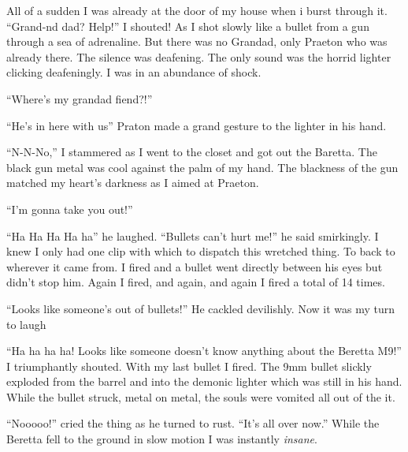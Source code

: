 All of a sudden I was already at the door of my house when i burst
through it. ``Grand-nd dad? Help!'' I shouted! As I shot slowly like
a bullet from a gun through a sea of adrenaline. But there was no
Grandad, only Praeton who was already there. The silence was
deafening. The only sound was the horrid lighter clicking
deafeningly. I was in an abundance of shock.



``Where's my grandad fiend?!''



``He's in here with us'' Praton made a grand gesture to the lighter
in his hand.



``N-N-No,'' I stammered as I went to the closet and got out the
Baretta. The black gun metal was cool against the palm of my hand.
The blackness of the gun matched my heart's darkness as I aimed at
Praeton.

``I'm gonna take you out!''

``Ha Ha Ha Ha ha'' he laughed. ``Bullets can't hurt me!'' he said
smirkingly. I knew I only had one clip with which to dispatch this
wretched thing. To back to wherever it came from. I fired and a
bullet went directly between his eyes but didn't stop him. Again I
fired, and again, and again I fired a total of 14 times.



``Looks like someone's out of bullets!'' He cackled devilishly. Now
it was my turn to laugh



``Ha ha ha ha! Looks like someone doesn't know anything about the
Beretta M9!'' I triumphantly shouted. With my last bullet I fired.
The 9mm bullet slickly exploded from the barrel and into the
demonic lighter which was still in his hand. While the bullet
struck, metal on metal, the souls were vomited all out of the
it.



``Nooooo!'' cried the thing as he turned to rust. ``It's all over
now.'' While the Beretta fell to the ground in slow motion I was
instantly {\em insane}. 
 



